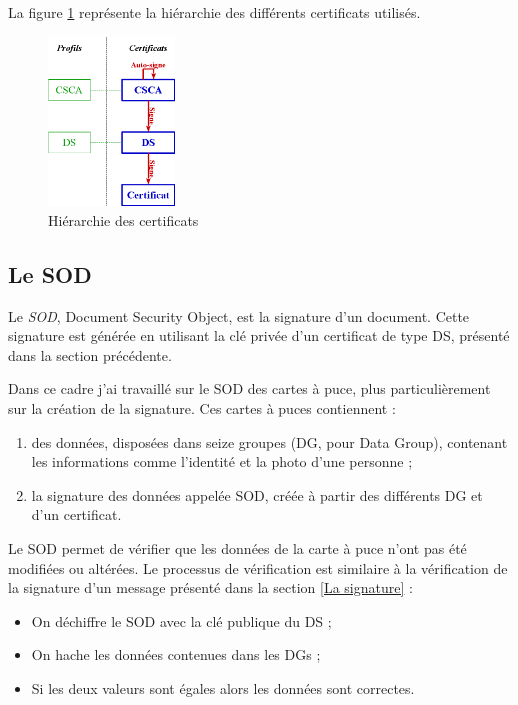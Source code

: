 La figure \ref{hierarchie_CSCA_DS} représente la hiérarchie des différents certificats utilisés.
\begin{figure}[!h]
	\center
	\includegraphics[width=0.3\textwidth]{img/hierarchie_CSCA_DS.png}
	\caption{Hiérarchie des certificats}
	\label{hierarchie_CSCA_DS}
\end{figure}


\subsection{Le SOD}

Le \textit{SOD}, Document Security Object, est la signature d'un document.
Cette signature est générée en utilisant la clé privée d'un certificat de type DS, présenté dans la section précédente.

Dans ce cadre j'ai travaillé sur le SOD des cartes à puce, plus particulièrement sur la création de la signature.
Ces cartes à puces contiennent :
\begin{enumerate}
	\item des données, disposées dans seize groupes (DG, pour Data Group), contenant les informations comme l'identité et la photo d'une personne ;
	\item la signature des données appelée SOD, créée à partir des différents DG et d'un certificat.
\end{enumerate}

Le SOD permet de vérifier que les données de la carte à puce n'ont pas été modifiées ou altérées.
Le processus de vérification est similaire à la vérification de la signature d'un message présenté dans la section \ref{La signature} :
\begin{itemize}
	\item On déchiffre le SOD avec la clé publique du DS ;
	\item On hache les données contenues dans les DGs ;
	\item Si les deux valeurs sont égales alors les données sont correctes.
\end{itemize}

